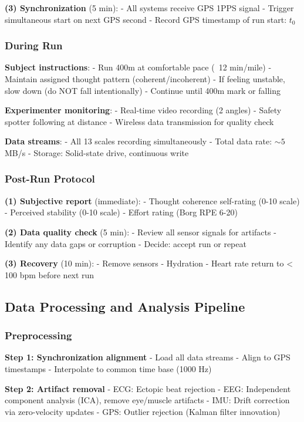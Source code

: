 \documentclass[11pt,onecolumn]{article}
\begin{document}
\textbf{(3) Synchronization} (5 min):
- All systems receive GPS 1PPS signal
- Trigger simultaneous start on next GPS second
- Record GPS timestamp of run start: $t_0$

\subsubsection{During Run}

\textbf{Subject instructions}:
- Run 400m at comfortable pace (~12 min/mile)
- Maintain assigned thought pattern (coherent/incoherent)
- If feeling unstable, slow down (do NOT fall intentionally)
- Continue until 400m mark or falling

\textbf{Experimenter monitoring}:
- Real-time video recording (2 angles)
- Safety spotter following at distance
- Wireless data transmission for quality check

\textbf{Data streams}:
- All 13 scales recording simultaneously
- Total data rate: $\sim 5$ MB/s
- Storage: Solid-state drive, continuous write

\subsubsection{Post-Run Protocol}

\textbf{(1) Subjective report} (immediate):
- Thought coherence self-rating (0-10 scale)
- Perceived stability (0-10 scale)
- Effort rating (Borg RPE 6-20)

\textbf{(2) Data quality check} (5 min):
- Review all sensor signals for artifacts
- Identify any data gaps or corruption
- Decide: accept run or repeat

\textbf{(3) Recovery} (10 min):
- Remove sensors
- Hydration
- Heart rate return to < 100 bpm before next run

\subsection{Data Processing and Analysis Pipeline}

\subsubsection{Preprocessing}

\textbf{Step 1: Synchronization alignment}
- Load all data streams
- Align to GPS timestamps
- Interpolate to common time base (1000 Hz)

\textbf{Step 2: Artifact removal}
- ECG: Ectopic beat rejection
- EEG: Independent component analysis (ICA), remove eye/muscle artifacts
- IMU: Drift correction via zero-velocity updates
- GPS: Outlier rejection (Kalman filter innovation)
\end{document}
